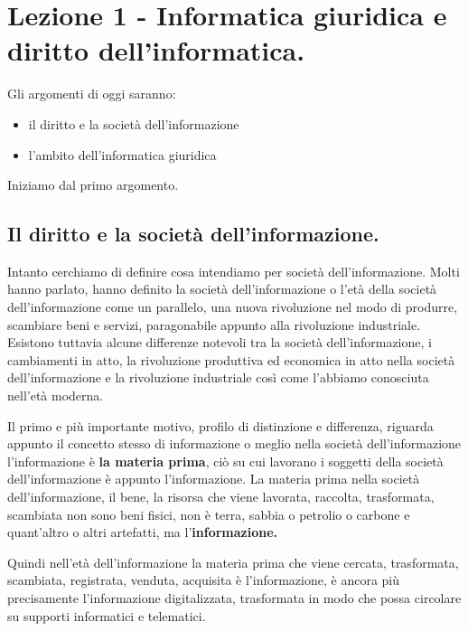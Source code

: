 \chapter{Lezione 1 - Informatica giuridica e diritto dell'informatica.}


Gli argomenti di oggi saranno:
\begin{itemize}
    \item il diritto e la società dell'informazione
    \item l'ambito dell'informatica giuridica
\end{itemize}
Iniziamo dal primo argomento. 
\section{Il diritto e la società dell'informazione.} Intanto cerchiamo di definire cosa intendiamo per società dell'informazione. Molti hanno parlato, hanno definito la società dell'informazione o l'età della società dell'informazione come un parallelo, una nuova rivoluzione nel modo di produrre, scambiare beni e servizi, paragonabile appunto alla rivoluzione industriale. Esistono tuttavia alcune differenze notevoli tra la società dell'informazione, i cambiamenti in atto, la rivoluzione produttiva ed economica in atto nella società dell'informazione e la rivoluzione industriale così come l'abbiamo conosciuta nell'età moderna. \par
Il primo e più importante motivo, profilo di distinzione e differenza, riguarda appunto il concetto stesso di informazione o meglio nella società dell'informazione l'informazione è \textbf{la materia prima}, ciò su cui lavorano i soggetti della società dell'informazione è appunto l'informazione. 
La materia prima nella società dell'informazione, il bene, la risorsa che viene lavorata, raccolta, trasformata, scambiata non sono beni fisici, non è terra, sabbia o petrolio o carbone e quant'altro o altri artefatti, ma l'\textbf{informazione.} \par 
Quindi nell'età dell'informazione la materia prima che viene cercata, trasformata, scambiata, registrata, venduta, acquisita è l'informazione, è ancora più precisamente l'informazione digitalizzata, trasformata in modo che possa circolare su supporti informatici e telematici. \par

